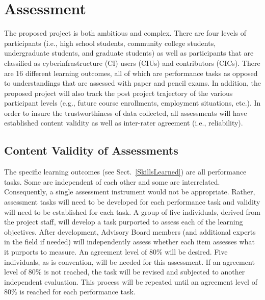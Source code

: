\documentclass[11pt]{NSFamsart}
\begin{document}
\section{Assessment} \label{Eval}
The proposed project is both ambitious and complex. There are four levels of participants (i.e., high school students, community college students, undergraduate students, and graduate students) as well as participants that are classified as cyberinfrastructure (CI) users (CIUs) and contributors (CICs). There are 16 different learning outcomes, all of which are performance tasks as opposed to understandings that are assessed with paper and pencil exams. In addition, the proposed project will also track the post project trajectory of the various participant levels (e.g., future course enrollments, employment situations, etc.). In order to insure the trustworthiness of data collected, all assessments will have established content validity as well as inter-rater agreement (i.e., reliability).

\subsection{Content Validity of Assessments}
The specific learning outcomes (see Sect.~\ref{SkillsLearned}) are all performance tasks. Some are independent of each other and some are interrelated. Consequently, a single assessment instrument would not be appropriate. Rather, assessment tasks will need to be developed for each performance task and validity will need to be established for each task. A group of five individuals, derived from the project staff, will develop a task purported to assess each of the learning objectives. After development, Advisory Board members (and additional experts in the field if needed) will independently assess whether each item assesses what it purports to measure. An agreement level of 80\% will be desired. Five individuals, as is convention, will be needed for this assessment. If an agreement level of 80\% is not reached, the task will be revised and subjected to another independent evaluation. This process will be repeated until an agreement level of 80\% is reached for each performance task. 
\end{document}
